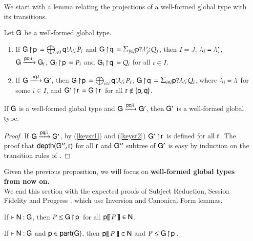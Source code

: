 We start with a lemma %
relating the projections of a well-formed global type
with its  transitions. 


\begin{lemma}\label{keysr}  Let ${\sf G}$ be a well-formed global type. 
\begin{enumerate}
\item\label{keysr1}
If ${\sf G} \! \upharpoonright \! {\sf p}\,=\bigoplus_{i\in I}{\sf q}!\lambda_i;P_i$ and $\proj\G\q=\inp\pp{j}{J}{\M'}{\Q}$, then $I=J$, $\lambda_i=\lambda_i'$, ${\sf G}\xrightarrow{{\sf p}{\sf q}\lambda_i}{\sf G}_i$, ${\sf G}_i \! \upharpoonright \! {\sf p}\,=P_i$ and ${\sf G}_i \! \upharpoonright \! {\sf q}\,=Q_i$ for all $i\in I$.
\item\label{keysr2} If ${\sf G}\xrightarrow{{\sf p}{\sf q}\lambda}{\sf G}'$, then
  ${\sf G} \! \upharpoonright \! {\sf p}\,=\bigoplus_{i\in I}{\sf q}!\lambda_i;P_i$,
  $\proj\G\q=\inp\pp{i}{I}{\M}{\Q}$, where $\lambda_i=\lambda$
for some $i\in I$, and 
${\sf G}' \! \upharpoonright \! {\sf r}\,={\sf G} \! \upharpoonright \! {\sf r}\,$ for all ${\sf r}\not\in\{{\sf p},{\sf q}\}$.
\end{enumerate}
\end{lemma}

\begin{proposition}\label{prop:wfs}
If ${\sf G}$ is a well-formed global type and ${\sf G}\xrightarrow{{\sf p}{\sf q}\lambda}{\sf G}'$, then ${\sf G}'$ is a well-formed global type.
\end{proposition}
\begin{proof}
If  ${\sf G}\xrightarrow{{\sf p}{\sf q}\lambda}{\sf G}'$, by  (\ref{keysr1}) and (\ref{keysr2})
${\sf G}' \! \upharpoonright \! {\sf r}\,$ is defined for all ${\sf r}$. 
The proof that ${\sf depth}({\sf G}'',{\sf r})$ for all ${\sf r}$ and ${\sf G}''$ subtree
of ${\sf G}'$ is easy by induction on the  transition   rules
of . 
\end{proof}
\noindent
Given the previous proposition, we will focus on {\bf well-formed global types  from now on.} \\


 We end this section with the expected proofs of Subject Reduction, Session Fidelity \cite{CHY08,CHY16}  and Progress \cite{Coppo2016,Padovani15}, which use Inversion and Canonical Form lemmas.

\begin{lemma}[Inversion]
If $\vdash {\sf N} :{\sf G}$, then $P\leq{\sf G} \! \upharpoonright \! {\sf p}\,$ for all  ${\sf p}[\![\,P\,]\!]\in{\sf N}$. \end{lemma}

\begin{lemma}
If  $\vdash {\sf N} :{\sf G}$ and
${\sf p}\in{\sf part}({\sf G})$, then ${\sf p}[\![\,P\,]\!]\in{\sf N}$ and $P\leq{\sf G} \! \upharpoonright \! {\sf p}\,$.
\end{lemma}


